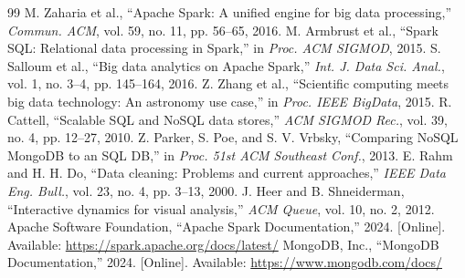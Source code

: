 \documentclass[10pt]{article}
\begin{document}
\begin{thebibliography}{99}
 M. Zaharia et al., ``Apache Spark: A unified engine for big data processing,'' \textit{Commun. ACM}, vol. 59, no. 11, pp. 56--65, 2016.
 M. Armbrust et al., ``Spark SQL: Relational data processing in Spark,'' in \textit{Proc. ACM SIGMOD}, 2015.
 S. Salloum et al., ``Big data analytics on Apache Spark,'' \textit{Int. J. Data Sci. Anal.}, vol. 1, no. 3--4, pp. 145--164, 2016.
 Z. Zhang et al., ``Scientific computing meets big data technology: An astronomy use case,'' in \textit{Proc. IEEE BigData}, 2015.
 R. Cattell, ``Scalable SQL and NoSQL data stores,'' \textit{ACM SIGMOD Rec.}, vol. 39, no. 4, pp. 12--27, 2010.
 Z. Parker, S. Poe, and S. V. Vrbsky, ``Comparing NoSQL MongoDB to an SQL DB,'' in \textit{Proc. 51st ACM Southeast Conf.}, 2013.
 E. Rahm and H. H. Do, ``Data cleaning: Problems and current approaches,'' \textit{IEEE Data Eng. Bull.}, vol. 23, no. 4, pp. 3--13, 2000.
 J. Heer and B. Shneiderman, ``Interactive dynamics for visual analysis,'' \textit{ACM Queue}, vol. 10, no. 2, 2012.
 Apache Software Foundation, ``Apache Spark Documentation,'' 2024. [Online]. Available: \url{https://spark.apache.org/docs/latest/}
 MongoDB, Inc., ``MongoDB Documentation,'' 2024. [Online]. Available: \url{https://www.mongodb.com/docs/}
\end{thebibliography}
\end{document}
